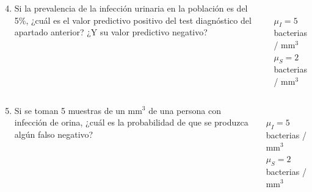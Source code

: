 \documentclass[aspectratio=149,10pt,xcolor=dvipsnames,t]{beamer}
\begin{document}
	
\begin{frame}
\begin{columns}
\begin{column}[T]{0.7\textwidth}
\begin{enumerate}
\setcounter{enumi}{3}
\item Si la prevalencia de la infección urinaria en la población es del 5\%, ¿cuál es el valor predictivo positivo del test
diagnóstico del apartado anterior? ¿Y su valor predictivo negativo?
\end{enumerate}
\end{column}
\begin{column}[T]{0.3\textwidth}
\\
$\mu_I = 5$ bacterias / mm$^3$\\
$\mu_S = 2$ bacterias / mm$^3$\\
\end{column}
\end{columns} 
\end{frame}	
	
	
\begin{frame}
\begin{columns}
\begin{column}[T]{0.7\textwidth}
\begin{enumerate}
\setcounter{enumi}{4}
\item Si se toman 5 muestras de un mm$^3$ de una persona con infección de orina, ¿cuál es la probabilidad de que se produzca
algún falso negativo?
\end{enumerate}
\end{column}
\begin{column}[T]{0.3\textwidth}
\\
$\mu_I = 5$ bacterias / mm$^3$\\
$\mu_S = 2$ bacterias / mm$^3$\\
\end{column}
\end{columns} 
\end{frame}	
\end{document}

